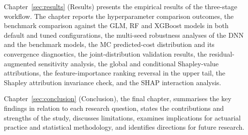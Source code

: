 Chapter~\ref{sec:results} (Results)
presents the empirical results of the three-stage workflow.
The chapter reports the hyperparameter comparison outcomes, the
benchmark comparison against the GLM, RF and XGBoost
models in both default and tuned configurations, the multi-seed
robustness analyses of the DNN and the benchmark models, the
MC predicted-cost distribution and its convergence
diagnostics, the joint-distribution validation results, the
residual-augmented sensitivity analysis, the global and conditional
Shapley-value attributions, the feature-importance ranking reversal in
the upper tail, the Shapley attribution invariance check, and the
SHAP interaction analysis.

Chapter~\ref{sec:conclusion} (Conclusion), the final chapter, summarises the key findings in relation to each
research question, states the contributions and strengths of the study,
discusses limitations, examines implications for actuarial practice and
statistical methodology, and identifies directions for future research.

